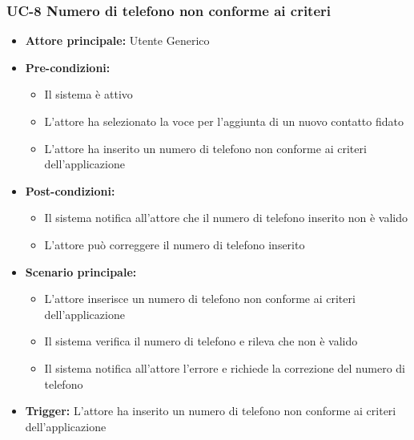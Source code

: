 \documentclass[a4paper,12pt]{article}
\newcommand{\ignoreglossary}{}
\begin{document}
\subsubsection{UC-8 Numero di telefono non conforme ai criteri} \label{subsec:UC-8}
\begin{itemize}
    \item \textbf{Attore principale:} Utente Generico
    \item \textbf{Pre-condizioni:}
    \begin{itemize}
        \item Il sistema è attivo
        \item L'attore ha selezionato la voce per l'aggiunta di un nuovo contatto fidato
        \item L'attore ha inserito un numero di telefono non conforme ai criteri dell'applicazione
    \end{itemize}
    \item \textbf{Post-condizioni:} 
    \begin{itemize}
        \item Il sistema notifica all'attore che il numero di telefono inserito non è valido
        \item L'attore può correggere il numero di telefono inserito
    \end{itemize}
    \item \textbf{Scenario principale:} 
    \begin{itemize}        
        \item L'attore inserisce un numero di telefono non conforme ai criteri dell'applicazione
        \item Il sistema \ignoreglossary{verifica} il numero di telefono e rileva che non è valido
        \item Il sistema notifica all'attore l'errore e richiede la correzione del numero di telefono
    \end{itemize}
    \item \textbf{Trigger:} L'attore ha inserito un numero di telefono non conforme ai criteri dell'applicazione
\end{itemize}
\end{document}
